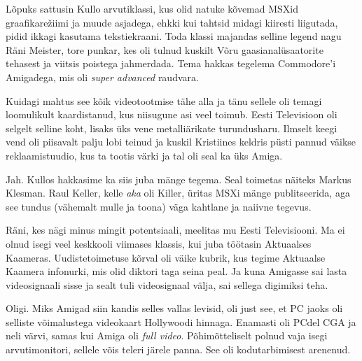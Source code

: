 Lõpuks sattusin Kullo 
arvutiklassi, kus olid natuke kõvemad MSXid graafikarežiimi ja muude asjadega, ehkki kui 
tahtsid midagi kiiresti liigutada, pidid ikkagi kasutama tekstiekraani. Toda 
klassi majandas selline legend nagu Räni Meister, tore punkar, kes oli tulnud kuskilt Võru 
gaasianalüsaatorite tehasest ja viitsis poistega jahmerdada. Tema 
hakkas tegelema Commodore'i 
Amigadega, mis oli 
\emph{super advanced} raudvara. 

Kuidagi mahtus see kõik videotootmise tähe alla ja tänu 
sellele oli temagi loomulikult kaardistanud, kus niisugune asi veel toimub. 
Eesti Televisioon oli selgelt 
selline koht, lisaks üks vene metalliärikate turundusharu. Ilmselt keegi 
vend oli piisavalt palju lobi teinud ja kuskil Kristiines keldris püsti 
pannud väikse reklaamistuudio, kus ta tootis värki ja tal oli 
seal ka üks Amiga. 


Jah. Kullos hakkasime ka siis juba mänge tegema. Seal toimetas näiteks Markus Klesman. Raul 
Keller, kelle \emph{aka} oli 
Killer, üritas MSXi mänge 
publitseerida, aga see tundus (vähemalt mulle ja toona) väga 
kahtlane ja naiivne tegevus.

Räni, kes nägi minus mingit potentsiaali, 
meelitas mu Eesti Televisiooni. Ma ei olnud isegi veel keskkooli viimases klassis, 
kui juba töötasin Aktuaalses Kaameras. Uudistetoimetuse kõrval oli 
väike kubrik, kus tegime Aktuaalse Kaamera infonurki, mis olid diktori 
taga seina peal. Ja kuna Amigasse 
sai lasta videosignaali sisse ja sealt tuli videosignaal välja, sai 
sellega digimiksi teha. 


Oligi. Miks Amigad siin kandis selles vallas levisid, oli just see, et PC 
jaoks oli selliste võimalustega videokaart Hollywoodi hinnaga. Enamasti oli PCdel 
CGA ja neli värvi, samas kui 
Amiga oli \emph{full video}. Põhimõtteliselt polnud 
vaja isegi arvutimonitori, sellele võis teleri järele panna. See oli 
kodutarbimisest arenenud. 

